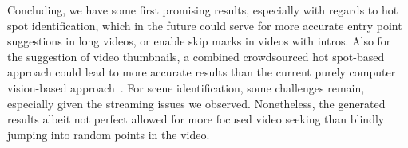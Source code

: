 \documentclass[10pt,twocolumn,letterpaper]{article}
\begin{document}
Concluding, we have some first promising results, especially with regards to hot spot identification, which in the future could serve for more accurate entry point suggestions in long videos, or enable skip marks in videos with intros. Also for the suggestion of video thumbnails, a combined crowdsourced hot spot-based approach could lead to more accurate results than the current purely computer vision-based approach~\cite{googleresearch}. For scene identification, some challenges remain, especially given the streaming issues we observed. Nonetheless, the generated results albeit not perfect allowed for more focused video seeking than blindly jumping into random points in the video.

{\small


}
\end{document}
